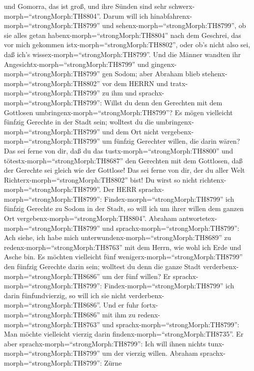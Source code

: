 und Gomorra, das ist groß, und ihre Sünden sind sehr
schwerx-morph=``strongMorph:TH8804''.  Darum will ich
hinabfahrenx-morph=``strongMorph:TH8799'' und
sehenx-morph=``strongMorph:TH8799'', ob sie alles getan
habenx-morph=``strongMorph:TH8804'' nach dem Geschrei, das vor mich
gekommen istx-morph=``strongMorph:TH8802'', oder ob's nicht also sei,
daß ich's wissex-morph=``strongMorph:TH8799''.  Und die
Männer wandten ihr Angesichtx-morph=``strongMorph:TH8799'' und
gingenx-morph=``strongMorph:TH8799'' gen Sodom; aber Abraham blieb
stehenx-morph=``strongMorph:TH8802'' vor dem HERRN  und
tratx-morph=``strongMorph:TH8799'' zu ihm und
sprachx-morph=``strongMorph:TH8799'': Willst du denn den Gerechten mit
dem Gottlosen umbringenx-morph=``strongMorph:TH8799''?  Es
mögen vielleicht fünfzig Gerechte in der Stadt sein; wolltest du die
umbringenx-morph=``strongMorph:TH8799'' und dem Ort nicht
vergebenx-morph=``strongMorph:TH8799'' um fünfzig Gerechter willen, die
darin wären?  Das sei ferne von dir, daß du das
tustx-morph=``strongMorph:TH8800'' und
tötestx-morph=``strongMorph:TH8687'' den Gerechten mit dem Gottlosen,
daß der Gerechte sei gleich wie der Gottlose! Das sei ferne von dir, der
du aller Welt Richterx-morph=``strongMorph:TH8802'' bist! Du wirst so
nicht richtenx-morph=``strongMorph:TH8799''.  Der HERR
sprachx-morph=``strongMorph:TH8799'':
Findex-morph=``strongMorph:TH8799'' ich fünfzig Gerechte zu Sodom in der
Stadt, so will ich um ihrer willen dem ganzen Ort
vergebenx-morph=``strongMorph:TH8804''.  Abraham
antwortetex-morph=``strongMorph:TH8799'' und
sprachx-morph=``strongMorph:TH8799'': Ach siehe, ich habe mich
unterwundenx-morph=``strongMorph:TH8689'' zu
redenx-morph=``strongMorph:TH8763'' mit dem Herrn, wie wohl ich Erde und
Asche bin.  Es möchten vielleicht fünf
wenigerx-morph=``strongMorph:TH8799'' den fünfzig Gerechte darin sein;
wolltest du denn die ganze Stadt verderbenx-morph=``strongMorph:TH8686''
um der fünf willen? Er sprachx-morph=``strongMorph:TH8799'':
Findex-morph=``strongMorph:TH8799'' ich darin fünfundvierzig, so will
ich sie nicht verderbenx-morph=``strongMorph:TH8686''.  Und
er fuhr fortx-morph=``strongMorph:TH8686'' mit ihm zu
redenx-morph=``strongMorph:TH8763'' und
sprachx-morph=``strongMorph:TH8799'': Man möchte vielleicht vierzig
darin findenx-morph=``strongMorph:TH8735''. Er aber
sprachx-morph=``strongMorph:TH8799'': Ich will ihnen nichts
tunx-morph=``strongMorph:TH8799'' um der vierzig willen. 
Abraham sprachx-morph=``strongMorph:TH8799'': Zürne

